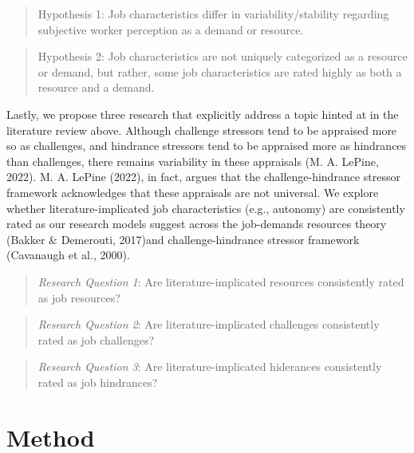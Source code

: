 \documentclass[
  man]{apa6}
\begin{document}
\begin{quote}
Hypothesis 1: Job characteristics differ in variability/stability regarding subjective worker perception as a demand or resource.
\end{quote}

\begin{quote}
Hypothesis 2: Job characteristics are not uniquely categorized as a resource or demand, but rather, some job characteristics are rated highly as both a resource and a demand.
\end{quote}

Lastly, we propose three research that explicitly address a topic hinted at in the literature review above. Although challenge stressors tend to be appraised more so as challenges, and hindrance stressors tend to be appraised more as hindrances than challenges, there remains variability in these appraisals (M. A. LePine, 2022). M. A. LePine (2022), in fact, argues that the challenge-hindrance stressor framework acknowledges that these appraisals are not universal. We explore whether literature-implicated job characteristics (e.g., autonomy) are consistently rated as our research models suggest across the job-demands resources theory (Bakker \& Demerouti, 2017)and challenge-hindrance stressor framework (Cavanaugh et al., 2000).

\begin{quote}
\emph{Research Question 1}: Are literature-implicated resources consistently rated as job resources?
\end{quote}

\begin{quote}
\emph{Research Question 2}: Are literature-implicated challenges consistently rated as job challenges?
\end{quote}

\begin{quote}
\emph{Research Question 3}: Are literature-implicated hiderances consistently rated as job hindrances?
\end{quote}

\hypertarget{method}{%
\section{Method}\label{method}}
\end{document}
